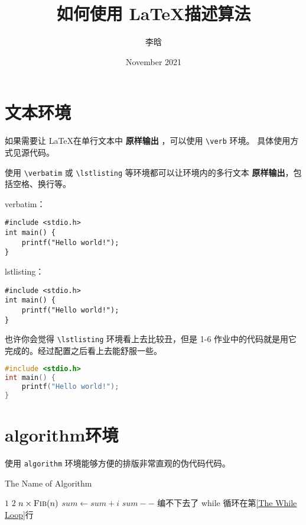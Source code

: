 \documentclass{ctexart}
\title{如何使用 \LaTeX 描述算法}
\author{李晗}
\date{November 2021}
\begin{document}
\maketitle

\section{文本环境}

如果需要让 \LaTeX 在单行文本中 \textbf{原样输出} ，可以使用 \verb|\verb| 环境。
具体使用方式见源代码。

使用 \verb|\verbatim| 或 \verb|\lstlisting| 等环境都可以让环境内的多行文本 \textbf{原样输出}，包括空格、换行等。

\noindent verbatim：
\begin{verbatim}
#include <stdio.h> 
int main() {
    printf("Hello world!");
}
\end{verbatim}

\noindent lstlisting：
\begin{lstlisting}
#include <stdio.h> 
int main() {
    printf("Hello world!");
}
\end{lstlisting}

也许你会觉得 \verb|\lstlisting| 环境看上去比较丑，但是 1-6 作业中的代码就是用它完成的。经过配置之后看上去能舒服一些。

\begin{lstlisting}[language=C++,style=style1]
#include <stdio.h> 
int main() {
    printf("Hello world!");
}
\end{lstlisting}

\section{algorithm环境}

使用 \verb|algorithm| 环境能够方便的排版非常直观的伪代码代码。

\begin{algorithm}[H]
  \caption{The Name of Algorithm}
  \label{alg:sum}
  \begin{algorithmic}[1]
     
        \State \Return $1$
         
        \State \Return $2$
      \Else
        \State \Return $n \times \Call{Fib}{n}$ 
      \EndIf
    \EndProcedure
        \State $ sum \gets sum + i $
      \EndFor
        \label{The While Loop}
        \State $ sum-- $
      \EndWhile
      \Repeat
        \State 编不下去了
        \State while 循环在第\ref{The While Loop}行
    \EndProcedure
  \end{algorithmic}
\end{algorithm}
\end{document}
